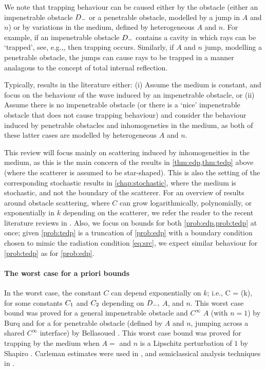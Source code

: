 We note that trapping behaviour can be caused either by the obstacle (either an impenetrable obstacle $D_{-}$ or a penetrable obstacle, modelled by a jump in $A$ and $n$) or by variations in the medium, defined by heterogeneous $A$ and $n$. For example, if an impenetrable obstacle $D_{-}$ contains a cavity in which rays can be `trapped', see, e.g.,, then trapping occurs. Similarly, if $A$ and $n$ jump, modelling a penetrable obstacle, the jumps can cause rays to be trapped in a manner analagous to the concept of total internal reflection.

Typically, results in the literature either: (i) Assume the medium is constant, and focus on the behaviour of the wave induced by an impenetrable obstacle, or (ii) Assume there is no impenetrable obstacle (or there is a `nice' impenetrable obstacle that does not cause trapping behaviour) and consider the behaviour induced by penetrable obstacles and inhomogeneties in the medium, as both of these latter cases are modelled by heterogeneous $A$ and $n$.

This review will focus mainly on scattering induced by inhomogeneities in the medium, as this is the main concern of the results in \cref{thm:edp,thm:tedp} above (where the scatterer is assumed to be star-shaped). This is also the setting of the corresponding stochastic results in \cref{chap:stochastic}, where the medium is stochastic, and not the boundary of the scatterer. For an overview of results around obstacle scattering, where $C$ can grow logarithmically, polynomially, or exponentially in $k$ depending on the scatterer, we refer the reader to the recent literature reviews in \cite[Sections 1.1 and 1.3]{ChSpGiSm:17}. Also, we focus on bounds for both \cref{prob:edp,prob:tedp} at once; given \cref{prob:tedp} is a truncation of \cref{prob:edp} with a boundary condition chosen to mimic the radiation condition \cref{eq:src}, we expect similar behaviour for \cref{prob:tedp} as for \cref{prob:edp}.

\paragraph{The worst case for a priori bounds} In the worst case, the constant $C$ can depend exponentially on $k$; i.e.,
\beq\label{eq:expbound}
C = \Co \exp(k\Ct),
\eeq
for some constants $C_{1}$ and $C_{2}$ depending on $D_{-}, $ $A$, and $n$. This worst case bound was proved for a general impenetrable obstacle and $C^\infty$ $A$ (with $n=1$) by Burq \cite{Bu:98} and for a for penetrable obstacle (defined by $A$ and $n$, jumping across a shared $C^\infty$ interface) by  Bellasoued \cite{Be:03}. This worst case bound was proved for trapping by the medium when $A=$ and $n$ is a Lipschitz perturbation of $1$ by Shapiro \cite{Sh:18}. Carleman estimates were used in \cite{Bu:98,Be:03}, and semiclassical analysis techniques in \cite{Sh:18}.

